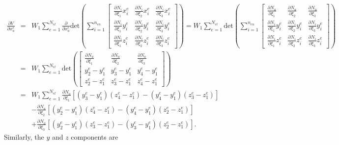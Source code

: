 \documentclass[12pt,aps,pre]{revtex4}
\begin{document}
\begin{eqnarray}
\frac{\partial V}{\partial x_a^e} &=& W_1\sum_{e=1}^{N_{el}} \frac{\partial}{\partial x_a^e}\text{det}\left(\sum_{i=1}^{n_{en}}
\begin{bmatrix}
\frac{\partial N_i}{\partial \xi_1} x_i^e & \frac{\partial N_i}{\partial \xi_2} x_i^e & \frac{\partial N_i}{\partial \xi_3} x_i^e \\
%
\frac{\partial N_i}{\partial \xi_1}y_i^e & \frac{\partial N_i}{\partial \xi_2}y_i^e & \frac{\partial N_i}{\partial \xi_3}y_i^e \\
%
\frac{\partial N_i}{\partial \xi_1}z_i^e & \frac{\partial N_i}{\partial \xi_2}z_i^e & \frac{\partial N_i}{\partial \xi_3}z_i^e 
\end{bmatrix}\right) = W_1\sum_{e=1}^{N_{el}} \text{det}\left(\sum_{i=1}^{n_{en}}
%
\begin{bmatrix}
\frac{\partial N_a}{\partial \xi_1}  & \frac{\partial N_a}{\partial \xi_2} & \frac{\partial N_a}{\partial \xi_3} \\
%
\frac{\partial N_i}{\partial \xi_1}y_i^e  & \frac{\partial N_i}{\partial \xi_2}y_i^e & \frac{\partial N_i}{\partial \xi_3}y_i^e \\
%
\frac{\partial N_i}{\partial \xi_1}z_i^e  & \frac{\partial N_i}{\partial \xi_2}z_i^e & \frac{\partial N_i}{\partial \xi_3}z_i^e 
\end{bmatrix}\right) \nonumber\\
&=& W_1\sum_{e=1}^{N_{el}} \text{det}\left(
%
\begin{bmatrix}
\frac{\partial N_a}{\partial \xi_1}  & \frac{\partial N_a}{\partial \xi_2} & \frac{\partial N_a}{\partial \xi_3} \\
%
y_2^e - y_1^e & y_3^e - y_1^e & y_4^e - y_1^e \\
%
z_2^e - z_1^e & z_3^e - z_1^e & z_4^e - z_1^e 
\end{bmatrix}\right)\nonumber\\
&=& W_1\sum_{e=1}^{N_{el}}\frac{\partial N_a}{\partial \xi_1}[(y_3^e - y_1^e)(z_4^e - z_1^e)-(y_4^e - y_1^e)(z_3^e - z_1^e)] \nonumber\\
%
&&-\frac{\partial N_a}{\partial \xi_2}\left[(y_2^e - y_1^e)(z_4^e - z_1^e)-(y_4^e - y_1^e)(z_2^e - z_1^e)\right] \nonumber\\
%
&&+\frac{\partial N_a}{\partial \xi_3}\left[(y_2^e - y_1^e)(z_3^e - z_1^e)-(y_3^e - y_1^e)(z_2^e - z_1^e)\right].
\label{eq:dVdx}
\end{eqnarray}
%
Similarly, the $y$ and $z$ components are
%
\end{document}
